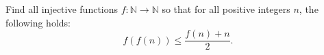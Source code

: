 Find all injective functions $f\colon\mathbb{N} \rightarrow \mathbb{N}$ so that
for all positive integers $n$, the following holds:
$$f(f(n)) \leq \frac{f(n)+n}{2}.$$